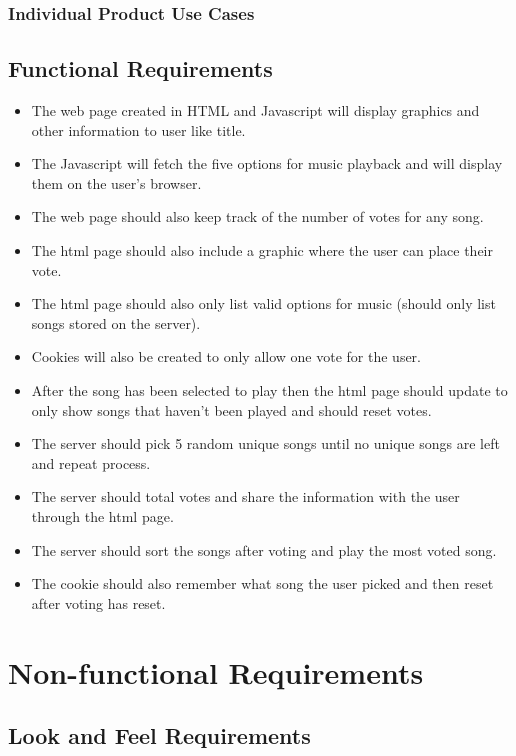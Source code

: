 \documentclass[12pt, titlepage]{article}
\begin{document}
\subsubsection{Individual Product Use Cases}

\subsection{Functional Requirements}
\begin{itemize}
\item The web page created in HTML and Javascript will display graphics and other information to user like title.
\item The Javascript will fetch the five options for music playback and will display them on the user's browser.
\item The web page should also keep track of the number of votes for any song.
\item The html page should also include a graphic where the user can place their vote.
\item The html page should also only list valid options for music (should only list songs stored on the server).
\item Cookies will also be created to only allow one vote for the user.
\item After the song has been selected to play then the html page should update to only show songs that haven't been played and should reset votes.
\item The server should pick 5 random unique songs until no unique songs are left and repeat process.
\item The server should total votes and share the information with the user through the html page.
\item The server should sort the songs after voting and play the most voted song.
\item The cookie should also remember what song the user picked and then reset after voting has reset.
\end{itemize}

\section{Non-functional Requirements}

\subsection{Look and Feel Requirements}
\end{document}
